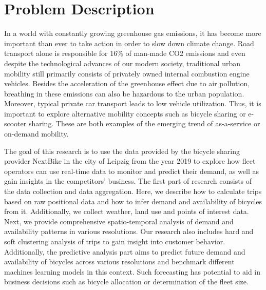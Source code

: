 \clearpage
\section{Problem Description}
\label{sec:problem_description}


In a world with constantly growing greenhouse gas emissions, it has become more important than ever to take action in order to slow down climate change. Road transport alone is responsible for 16\% of man-made CO2 emissions and even despite the technological advances of our modern society, traditional urban mobility still primarily consists of privately owned internal combustion engine vehicles. Besides the acceleration of the greenhouse effect due to air pollution, breathing in these emissions can also be hazardous to the urban population. Moreover, typical private car transport leads to low vehicle utilization. Thus, it is important to explore alternative mobility concepts such as bicycle sharing or e-scooter sharing. These are both examples of the emerging trend of as-a-service or on-demand mobility.

The goal of this research is to use the data provided by the bicycle sharing provider NextBike in the city of Leipzig from the year 2019 to explore how fleet operators can use real-time data to monitor and predict their demand, as well as gain insights in the competitors' business. The first part of research consists of the data collection and data aggregation. Here, we describe how to calculate trips based on raw positional data and how to infer demand and availability of bicycles from it. Additionally, we collect weather, land use and points of interest data. Next, we provide comprehensive spatio-temporal analysis of demand and availability patterns in various resolutions. Our research also includes hard and soft clustering analysis of trips to gain insight into customer behavior. Additionally, the predictive analysis part aims to predict future demand and availability of bicycles across various resolutions and benchmark different machines learning models in this context. Such forecasting has potential to aid in business decisions such as bicycle allocation or determination of the fleet size.